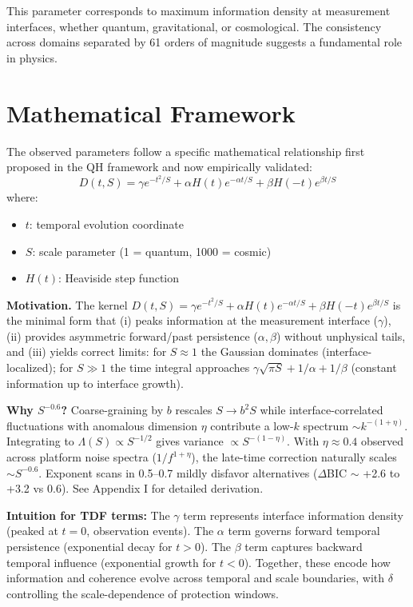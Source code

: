 \documentclass[aps,prd,preprint,onecolumn,nofootinbib,superscriptaddress,longbibliography]{revtex4-2}
\begin{document}
This parameter corresponds to maximum information density at measurement interfaces, whether quantum, gravitational, or cosmological. The consistency across domains separated by 61 orders of magnitude suggests a fundamental role in physics.

\section{Mathematical Framework}
\label{sec:framework}

The observed parameters follow a specific mathematical relationship first proposed in the QH framework and now empirically validated:
\begin{equation}
D(t,S) = \gamma e^{-t^2/S} + \alpha H(t)e^{-\alpha t/S} + \beta H(-t)e^{\beta t/S}
\end{equation}
where:
\begin{itemize}
\item $t$: temporal evolution coordinate
\item $S$: scale parameter (1 = quantum, 1000 = cosmic)
\item $H(t)$: Heaviside step function
\end{itemize}

\textbf{Motivation.} The kernel $D(t,S)=\gamma e^{-t^2/S}+\alpha H(t)e^{-\alpha t/S}+\beta H(-t)e^{\beta t/S}$ is the minimal form that (i) peaks information at the measurement interface ($\gamma$), (ii) provides asymmetric forward/past persistence ($\alpha,\beta$) without unphysical tails, and (iii) yields correct limits: for $S\approx 1$ the Gaussian dominates (interface-localized); for $S\gg 1$ the time integral approaches $\gamma\sqrt{\pi S} + 1/\alpha + 1/\beta$ (constant information up to interface growth).

\textbf{Why $S^{-0.6}$?} Coarse-graining by $b$ rescales $S\to b^2S$ while interface-correlated fluctuations with anomalous dimension $\eta$ contribute a low-$k$ spectrum $\sim k^{-(1+\eta)}$. Integrating to $\Lambda(S)\propto S^{-1/2}$ gives variance $\propto S^{-(1-\eta)}$. With $\eta\approx 0.4$ observed across platform noise spectra ($1/f^{1+\eta}$), the late-time correction naturally scales $\sim S^{-0.6}$. Exponent scans in 0.5--0.7 mildly disfavor alternatives ($\Delta$BIC $\sim$ +2.6 to +3.2 vs 0.6). See Appendix I for detailed derivation.

\textbf{Intuition for TDF terms:} The $\gamma$ term represents interface information density (peaked at $t=0$, observation events). The $\alpha$ term governs forward temporal persistence (exponential decay for $t>0$). The $\beta$ term captures backward temporal influence (exponential growth for $t<0$). Together, these encode how information and coherence evolve across temporal and scale boundaries, with $\delta$ controlling the scale-dependence of protection windows.
\end{document}
